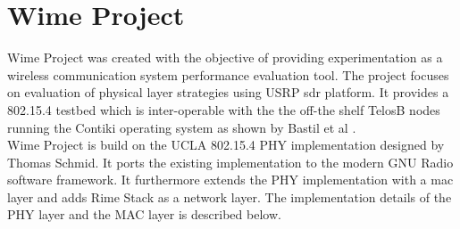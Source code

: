 \section{Wime Project}
Wime Project \cite{noauthor_wime_nodate} was created with the objective of providing experimentation as a wireless communication system performance evaluation tool.
The project focuses on evaluation of physical layer strategies using USRP \ac{sdr} platform.
It provides a 802.15.4 testbed which is inter-operable with the the off-the shelf TelosB nodes running the Contiki operating system as shown by Bastil et al \cite{bloessl2013gnu}.\\

Wime Project is build on the UCLA 802.15.4 PHY implementation \cite{ucla_phy} designed  by Thomas Schmid.
It ports the existing implementation to the modern GNU Radio software framework.
It furthermore extends the PHY implementation with a \ac{mac} layer and adds Rime Stack as a network layer.
The implementation details of the PHY layer and the MAC layer is described below.\\

